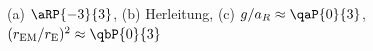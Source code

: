 (a) $\aRP{-3}{3}$, (b) Herleitung, (c) $g/a_R \approx \qaP{0}{3}$, $(r_\mathrm{EM}/r_\mathrm{E})^2 \approx \qbP{0}{3}$
